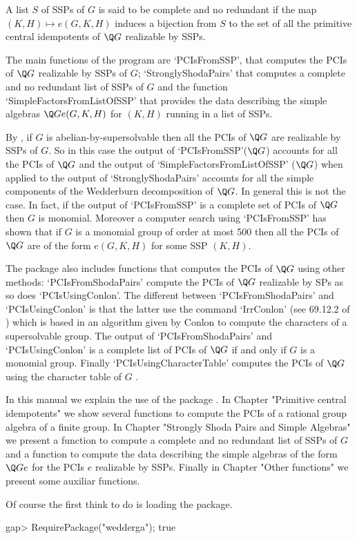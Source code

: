 A list $S$ of SSPs of $G$ is said to be complete and no redundant if the map $(K,H)\mapsto 
e(G,K,H)$ induces a bijection from $S$ to the set of all the primitive central idempotents of 
$\Q G$ realizable by SSPs. 
    
The main functions of the program are `PCIsFromSSP', that computes the PCIs of $\Q G$ 
realizable by SSPs of $G$; `StronglyShodaPairs' that computes a complete and no redundant list 
of SSPs of $G$ and the function `SimpleFactorsFromListOfSSP' that provides the data describing 
the simple algebras $\Q Ge(G,K,H)$ for $(K,H)$ running in a list of SSPs. 

By \cite{ORS}, if $G$ is abelian-by-supersolvable then all the PCIs of $\Q G$ are realizable 
by SSPs of $G$. So in this case the output of `PCIsFromSSP'($\Q G$) accounts for all the PCIs of $\Q 
G$ and the output of `SimpleFactorsFromListOfSSP' ($\Q G$) when applied to the output of 
`StronglyShodaPairs' accounts for all the simple components of the Wedderburn decomposition of 
$\Q G$. In general this is not the case. In fact, if the output of `PCIsFromSSP' is a complete 
set of PCIs of $\Q G$ then $G$ is monomial. Moreover a computer search using `PCIsFromSSP' has 
shown that if $G$ is a monomial group of order at most 500 then all the PCIs of $\Q G$ are of 
the form $e(G,K,H)$ for some SSP $(K,H)$. 

The package also includes functions that computes the PCIs of $\Q G$ using other 
methods: `PCIsFromShodaPairs' compute the PCIs of $\Q G$ realizable by SPs as so 
does `PCIsUsingConlon'. The different between `PCIsFromShodaPairs' and 
`PCIsUsingConlon' is that the latter use the command `IrrConlon' (see 69.12.2 of 
\cite{GapManual}) which is based in an algorithm given by Conlon \cite{C} to compute 
the characters of a supersolvable group. The output of `PCIsFromShodaPairs' and 
`PCIsUsingConlon' is a complete list of PCIs of $\Q G$ if and only if $G$ is a 
monomial group. Finally `PCIsUsingCharacterTable' computes the PCIs of $\Q G$ using 
the character table of $G$ \cite{Y}. 

In this manual we explain the use of the package {\wedderga}. In Chapter "Primitive central 
idempotents" we show several functions to compute the PCIs of a rational group algebra of a 
finite group. In Chapter "Strongly Shoda Pairs and Simple Algebras" we present a function to 
compute a complete and no redundant list of SSPs of $G$ and a function to compute the data 
describing the simple algebras of the form $\Q Ge$ for the PCIs $e$ realizable by SSPs. 
Finally in Chapter "Other functions" we present some auxiliar functions.
\bigskip 

Of course the first think to do is loading the package.

\beginexample
    gap> RequirePackage("wedderga");
    true
\endexample

